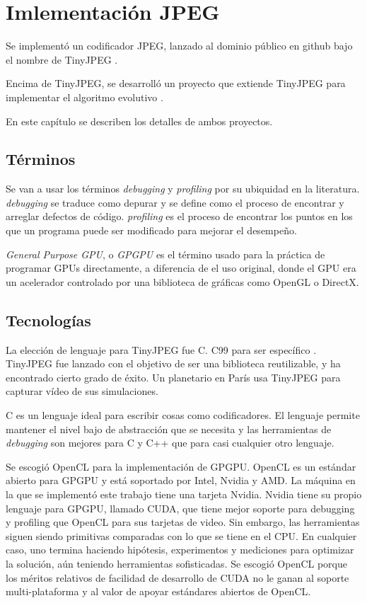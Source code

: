 \chapter{Imlementación JPEG}\label{ch:implementacion}

Se implementó un codificador JPEG, lanzado al dominio público en github bajo el
nombre de TinyJPEG \cite{tiny_jpeg}.

Encima de TinyJPEG, se desarrolló un proyecto que extiende TinyJPEG para
implementar el algoritmo evolutivo \cite{gp_encoder}.

En este capítulo se describen los detalles de ambos proyectos.

\section {Términos}
Se van a usar los términos \emph{\gls{debugging}} y \emph{\gls{profiling}} por
su ubiquidad en la literatura. \emph{debugging} se traduce como depurar y se
define como el proceso de encontrar y arreglar defectos de código.
\emph{profiling} es el proceso de encontrar los puntos en los que un programa
puede ser modificado para mejorar el desempeño.

\emph{General Purpose GPU}, o \emph{\gls{GPGPU}} es el término usado para la
práctica de programar GPUs directamente, a diferencia de el uso original, donde
el GPU era un acelerador controlado por una biblioteca de gráficas como OpenGL
o DirectX.

\section{Tecnologías}

La elección de lenguaje para TinyJPEG fue C. C99 para ser específico
\cite{c99}. TinyJPEG fue lanzado con el objetivo de ser una biblioteca
reutilizable, y ha encontrado cierto grado de éxito. Un planetario en París usa
TinyJPEG para capturar vídeo de sus simulaciones.

C es un lenguaje ideal para escribir cosas como codificadores. El lenguaje
permite mantener el nivel bajo de abstracción que se necesita y las
herramientas de \emph{debugging} son mejores para C y C++ que para casi
cualquier otro lenguaje.

Se escogió OpenCL para la implementación de GPGPU. OpenCL es un estándar abierto
para GPGPU y está soportado por Intel, Nvidia y AMD. La máquina en la que se
implementó este trabajo tiene una tarjeta Nvidia. Nvidia tiene su propio
lenguaje para GPGPU, llamado CUDA, que tiene mejor soporte para debugging y
profiling que OpenCL para sus tarjetas de video. Sin embargo, las herramientas
siguen siendo primitivas comparadas con lo que se tiene en el CPU. En cualquier
caso, uno termina haciendo hipótesis, experimentos y mediciones para optimizar la
solución, aún teniendo herramientas sofisticadas. Se escogió OpenCL porque los
méritos relativos de facilidad de desarrollo de CUDA no le ganan al soporte
multi-plataforma y al valor de apoyar estándares abiertos de OpenCL.


